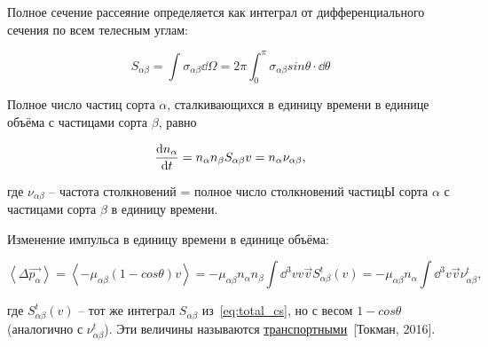 \documentclass[10pt, a4paper]{article}
\newcommand{\Tokman}{~[Токман, 2016]}
\begin{document}
Полное сечение рассеяние определяется как интеграл от дифференциального сечения по всем телесным углам:

\begin{equation} \label{eq:total_cs}
	S_{\alpha\beta} = \int \sigma_{\alpha\beta} \dd\Omega = 2 \pi \int_{0}^{\pi} \sigma_{\alpha\beta} sin\theta \cdot \dd\theta
\end{equation}

Полное число частиц сорта $\alpha$, сталкивающихся в единицу времени в единице объёма с частицами сорта $\beta$, равно

\begin{equation*}
	\dv{n_\alpha}{t} = n_\alpha n_\beta S_{\alpha\beta} v = n_\alpha\nu_{\alpha\beta},
\end{equation*}

где $\nu_{\alpha\beta}$ -- частота столкновений = полное число столкновений частицЫ сорта $\alpha$ с частицами сорта $\beta$ в единицу времени.

Изменение импульса в единицу времени в единице объёма:

\begin{equation*}
	\left\langle \Delta \vec{p_\alpha}\right\rangle = \left\langle -\mu_{\alpha\beta}(1-cos\theta)v \right\rangle = -\mu_{\alpha\beta}n_\alpha n_\beta \int \dd^3v v \vec{v} S_{\alpha\beta}^t(v) = -\mu_{\alpha\beta}n_\alpha\int \dd^3v \vec{v}\nu_{\alpha\beta}^t,
\end{equation*}

где $S_{\alpha\beta}^t(v)$ -- тот же интеграл $S_{\alpha\beta}$ из~\eqref{eq:total_cs}, но с весом $1-cos\theta$ (аналогично с $\nu_{\alpha\beta}^t$). Эти величины называются \uline{транспортными}\Tokman.
\end{document}
